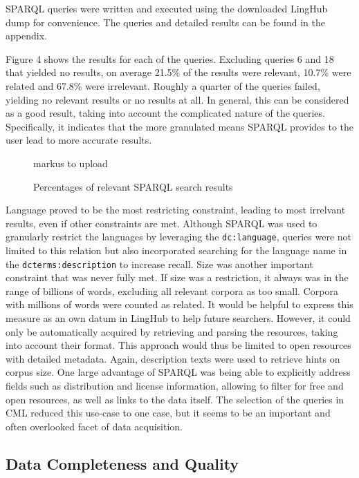 \documentclass[smallextended]{svjour3}       %
\begin{document}
SPARQL queries were written and executed using the downloaded LingHub dump for
convenience. The queries and detailed results can be found in the appendix.

Figure 4 shows the results for each of the queries. Excluding queries 6 and 18
that yielded no results, on average 21.5\% of the results were relevant, 10.7\%
were related and 67.8\% were irrelevant. Roughly a quarter of the queries
failed, yielding no relevant results or no results at all. In general, this can
be considered as a good result, taking into account the complicated nature of
the queries. Specifically, it indicates that the more granulated means SPARQL
provides to the user lead to more accurate results. 

\begin{figure}
    markus to upload
    \caption{\label{fig:sparql}Percentages of relevant SPARQL search results}
\end{figure}

Language proved to be the most restricting constraint, leading to most irrelvant
results, even if other constraints are met. Although SPARQL was used to
granularly restrict the 
languages by leveraging the \texttt{dc:language}, queries were not limited to
this relation but also incorporated searching for the language name in the
\texttt{dcterms:description} to increase recall. 
Size was another important constraint that was never fully met. If size was a
restriction, it always was in the range of billions of words, excluding all
relevant corpora as too small. Corpora with millions of words were counted as
related. It would be helpful to express this measure as an own datum in LingHub
to help future searchers. However, it could only be automatically acquired by
retrieving and parsing the resources, taking into account their format. This
approach would thus be limited to open resources with detailed metadata. Again,
description texts were used to retrieve hints on corpus size.
One large advantage of SPARQL was being able to explicitly address fields such
as distribution and license information, allowing to filter for free and open
resources, as well as links to the data itself. The selection of the queries in
CML reduced this use-case to one case, but it seems to be an important and often
overlooked facet of data acquisition. 

\subsection{Data Completeness and Quality}
\end{document}
